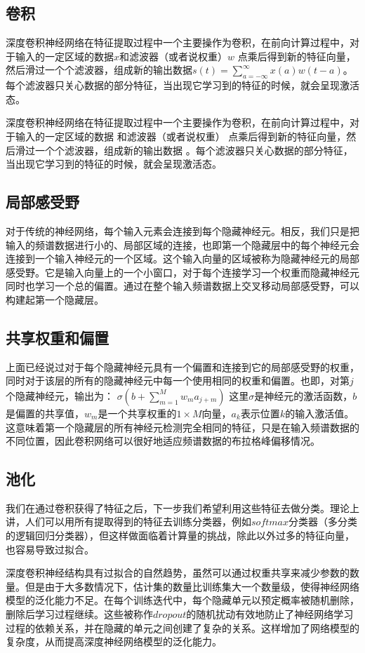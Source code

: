 \subsection{卷积}
深度卷积神经网络在特征提取过程中一个主要操作为卷积，在前向计算过程中，对于输入的一定区域的数据$x$和滤波器（或者说权重）$w$ 点乘后得到新的特征向量，然后滑过一个个滤波器，组成新的输出数据$s(t)=\sum_{a=-\infty}^{\infty}x(a)w(t-a) $。每个滤波器只关心数据的部分特征，当出现它学习到的特征的时候，就会呈现激活态。

深度卷积神经网络在特征提取过程中一个主要操作为卷积，在前向计算过程中，对于输入的一定区域的数据 和滤波器（或者说权重） 点乘后得到新的特征向量，然后滑过一个个滤波器，组成新的输出数据 。每个滤波器只关心数据的部分特征，当出现它学习到的特征的时候，就会呈现激活态。

\subsection{局部感受野}
对于传统的神经网络，每个输入元素会连接到每个隐藏神经元。相反，我们只是把输入的频谱数据进行小的、局部区域的连接，也即第一个隐藏层中的每个神经元会连接到一个输入神经元的一个区域。这个输入向量的区域被称为隐藏神经元的局部感受野。它是输入向量上的一个小窗口，对于每个连接学习一个权重而隐藏神经元同时也学习一个总的偏置。通过在整个输入频谱数据上交叉移动局部感受野，可以构建起第一个隐藏层。

\subsection{共享权重和偏置}
上面已经说过对于每个隐藏神经元具有一个偏置和连接到它的局部感受野的权重，同时对于该层的所有的隐藏神经元中每一个使用相同的权重和偏置。也即，对第$j$个隐藏神经元，输出为：
$\sigma(b+\sum_{m=1}^M w_m a_{j+m}) $
这里$\sigma$是神经元的激活函数，$b$是偏置的共享值，$w_m$是一个共享权重的$1\times M$向量，$a_k$表示位置$k$的输入激活值。这意味着第一个隐藏层的所有神经元检测完全相同的特征，只是在输入频谱数据的不同位置，因此卷积网络可以很好地适应频谱数据的布拉格峰偏移情况。

\subsection{池化}
我们在通过卷积获得了特征之后，下一步我们希望利用这些特征去做分类。理论上讲，人们可以用所有提取得到的特征去训练分类器，例如$softmax$分类器（多分类的逻辑回归分类器），但这样做面临着计算量的挑战，除此以外过多的特征向量，也容易导致过拟合。

深度卷积神经结构具有过拟合的自然趋势，虽然可以通过权重共享来减少参数的数量。但是由于大多数情况下，估计集的数量比训练集大一个数量级，使得神经网络模型的泛化能力不足。在每个训练迭代中，每个隐藏单元以预定概率被随机删除，删除后学习过程继续。这些被称作$dropout$的随机扰动有效地防止了神经网络学习过程的依赖关系，并在隐藏的单元之间创建了复杂的关系。这样增加了网络模型的复杂度，从而提高深度神经网络模型的泛化能力。
